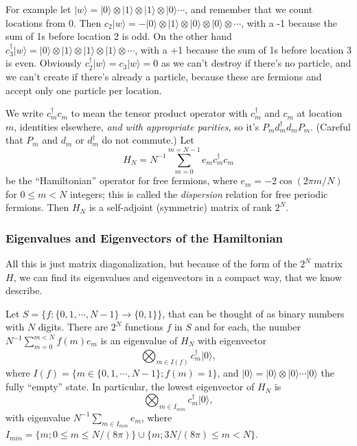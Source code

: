 	For example let $|w\rangle=|0\rangle\otimes|1\rangle\otimes|1\rangle\otimes|0\rangle\cdots$, and remember that we count locations from $0$.
	Then $c_2|w\rangle=-|0\rangle\otimes|1\rangle\otimes|0\rangle\otimes|0\rangle\otimes\cdots$, with a -1 because the sum of 1s before location 2 is odd.
	On the other hand $c^\dagger_3|w\rangle = |0\rangle\otimes|1\rangle\otimes|1\rangle\otimes|1\rangle\otimes\cdots$, with a +1 because
	the sum of 1s before location 3 is even. Obviously  $c_2^\dagger|w\rangle = c_3|w\rangle = 0$ as we can't destroy if there's no particle,
	and we can't create if there's already a particle, because these are fermions and accept only one particle per location.
	 
	We write $c^\dagger_m c_m$ to mean the tensor product operator with $c^\dagger_m$ and $c_m$ at location $m$, 
	identities elsewhere, \emph{and with appropriate parities,} so it's $P_m d^\dagger_m  d_m P_m$. (Careful that $P_m$ and $d_m$ or $d^\dagger_m$ do not commute.)
	Let 
	\begin{equation}
	H_N=N^{-1}\sum_{m=0}^{m=N-1} e_m c^\dagger_m c_m
	\end{equation} be the ``Hamiltonian'' operator for free fermions, where $e_m = -2\cos(2\pi m/N)$ for $0\le m < N$ integers;
	this is called the \emph{dispersion} relation for free periodic fermions.
	Then $H_N$ is a self-adjoint (symmetric) matrix of rank $2^N$.
	
	\subsubsection{Eigenvalues and Eigenvectors of the Hamiltonian}
	All this is just matrix diagonalization, but because of the form of the $2^N$ matrix $H$, we can find its
	eigenvalues and eigenvectors in a compact way, that we know describe.
	
	Let $S = \{ f: \{0, 1, \cdots, N - 1\} \rightarrow \{0, 1\}\}$, that can be thought of as binary numbers with $N$ digits.
	There are $2^N$ functions $f$ in $S$ and for each, the number
	$N^{-1}\sum_{m=0}^{m < N} f(m) e_m$ is an eigenvalue of $H_N$ with eigenvector
	\[
	\bigotimes_{m\in I(f)}c^\dagger_{m}|0\rangle,
	\]
	 where $I(f) = \{m\in\{0, 1, \cdots, N - 1\}; f(m) = 1\}$,  
	and $|0\rangle = |0\rangle\otimes|0\rangle\cdots|0\rangle$ the fully ``empty'' state.
 	 In particular, the lowest eigenvector of $H_N$ is
 	 \[
 	 \bigotimes_{m\in I_{min}}c^\dagger_{m}|0\rangle,
 	 \]
 	 with eigenvalue $N^{-1}\sum_{m \in I_{min}} e_m$, where $I_{min} = \{m; 0\le m \le N/(8\pi)\}\cup\{m; 3N/(8\pi)\le m < N\}$.
 	
